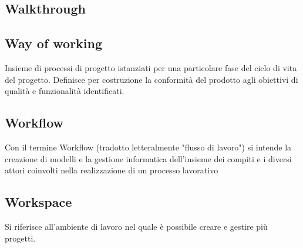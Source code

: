 
\subsection*{Walkthrough}

\subsection*{Way of working}
Insieme  di  processi  di  progetto  istanziati  per  una  particolare  fase  del  ciclo  di  vita  del
progetto.   Definisce  per  costruzione  la  conformità  del  prodotto  agli  obiettivi  di
qualità e funzionalità identificati.

\subsection*{Workflow}
Con il termine Workflow (tradotto letteralmente "flusso di lavoro") si intende la creazione di modelli e la gestione informatica dell'insieme dei compiti e i diversi attori coinvolti nella realizzazione di un processo lavorativo

\subsection*{Workspace}
Si riferisce all’ambiente di lavoro nel quale è possibile creare e gestire più progetti.

